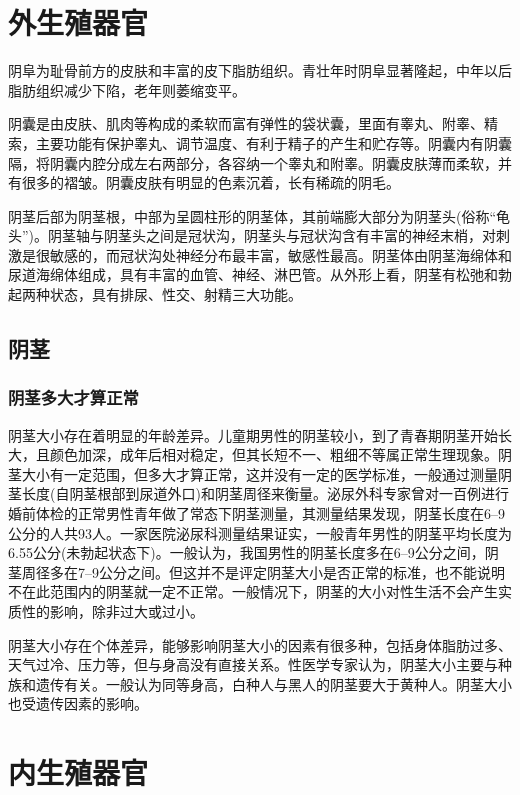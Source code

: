 \documentclass[12pt,UTF8]{ctexbook}
\begin{document}
\section{外生殖器官}

阴阜为耻骨前方的皮肤和丰富的皮下脂肪组织。青壮年时阴阜显著隆起，中年以后脂肪组织减少下陷，老年则萎缩变平。

阴囊是由皮肤、肌肉等构成的柔软而富有弹性的袋状囊，里面有睾丸、附睾、精索，主要功能有保护睾丸、调节温度、有利于精子的产生和贮存等。阴囊内有阴囊隔，将阴囊内腔分成左右两部分，各容纳一个睾丸和附睾。阴囊皮肤薄而柔软，并有很多的褶皱。阴囊皮肤有明显的色素沉着，长有稀疏的阴毛。

阴茎后部为阴茎根，中部为呈圆柱形的阴茎体，其前端膨大部分为阴茎头(俗称“龟头”)。阴茎轴与阴茎头之间是冠状沟，阴茎头与冠状沟含有丰富的神经末梢，对刺激是很敏感的，而冠状沟处神经分布最丰富，敏感性最高。阴茎体由阴茎海绵体和尿道海绵体组成，具有丰富的血管、神经、淋巴管。从外形上看，阴茎有松弛和勃起两种状态，具有排尿、性交、射精三大功能。

\subsection{阴茎}

\subsubsection{阴茎多大才算正常}

阴茎大小存在着明显的年龄差异。儿童期男性的阴茎较小，到了青春期阴茎开始长大，且颜色加深，成年后相对稳定，但其长短不一、粗细不等属正常生理现象。阴茎大小有一定范围，但多大才算正常，这并没有一定的医学标准，一般通过测量阴茎长度(自阴茎根部到尿道外口)和阴茎周径来衡量。泌尿外科专家曾对一百例进行婚前体检的正常男性青年做了常态下阴茎测量，其测量结果发现，阴茎长度在6--9公分的人共93人。一家医院泌尿科测量结果证实，一般青年男性的阴茎平均长度为6.55公分(未勃起状态下)。一般认为，我国男性的阴茎长度多在6--9公分之间，阴茎周径多在7--9公分之间。但这并不是评定阴茎大小是否正常的标准，也不能说明不在此范围内的阴茎就一定不正常。一般情况下，阴茎的大小对性生活不会产生实质性的影响，除非过大或过小。

阴茎大小存在个体差异，能够影响阴茎大小的因素有很多种，包括身体脂肪过多、天气过冷、压力等，但与身高没有直接关系。性医学专家认为，阴茎大小主要与种族和遗传有关。一般认为同等身高，白种人与黑人的阴茎要大于黄种人。阴茎大小也受遗传因素的影响。

\section{内生殖器官}
\end{document}
